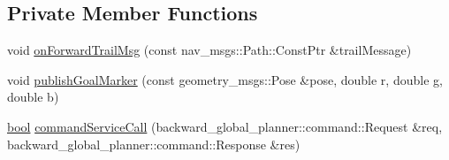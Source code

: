 \subsection*{Private Member Functions}
\begin{DoxyCompactItemize}
\item 
void \hyperlink{classbackward__global__planner_1_1BackwardGlobalPlanner_a093adf2db8ab6ca7a2fed8bd18eb9ded}{on\+Forward\+Trail\+Msg} (const nav\+\_\+msgs\+::\+Path\+::\+Const\+Ptr \&trail\+Message)
\item 
void \hyperlink{classbackward__global__planner_1_1BackwardGlobalPlanner_af1211f3b9a8d1c35bb4ba3e17c7758e9}{publish\+Goal\+Marker} (const geometry\+\_\+msgs\+::\+Pose \&pose, double r, double g, double b)
\item 
\hyperlink{classbool}{bool} \hyperlink{classbackward__global__planner_1_1BackwardGlobalPlanner_a2c317353dfc5afdd585c26a7c18abb62}{command\+Service\+Call} (backward\+\_\+global\+\_\+planner\+::command\+::\+Request \&req, backward\+\_\+global\+\_\+planner\+::command\+::\+Response \&res)
\end{DoxyCompactItemize}
